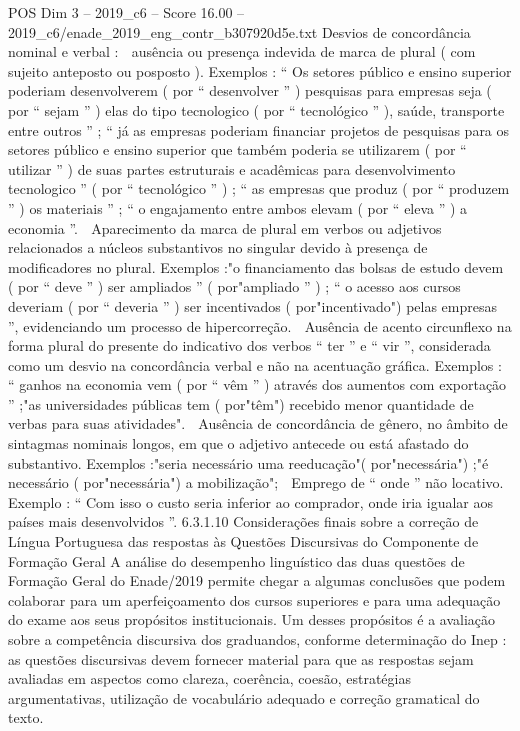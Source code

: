 \begin{textsample}{POS Dim 3 – 2019\_c6 – Score 16.00 – 2019\_c6/enade\_2019\_eng\_contr\_b307920d5e.txt}
Desvios de concordância nominal e verbal :  ausência ou presença indevida de marca de plural ( com sujeito anteposto ou posposto ).
Exemplos : “ Os setores público e ensino superior poderiam desenvolverem ( por “ desenvolver ” ) pesquisas para empresas seja ( por “ sejam ” ) elas do tipo tecnologico ( por “ tecnológico ” ), saúde, transporte entre outros ” ; “ já as empresas poderiam financiar projetos de pesquisas para os setores público e ensino superior que também poderia se utilizarem ( por “ utilizar ” ) de suas partes estruturais e acadêmicas para desenvolvimento tecnologico ” ( por “ tecnológico ” ) ; “ as empresas que produz ( por “ produzem ” ) os materiais ” ; “ o engajamento entre ambos elevam ( por “ eleva ” ) a economia ”.  Aparecimento da marca de plural em verbos ou adjetivos relacionados a núcleos substantivos no singular devido à presença de modificadores no plural.
Exemplos :"o financiamento das bolsas de estudo devem ( por “ deve ” ) ser ampliados ” ( por"ampliado ” ) ; “ o acesso aos cursos deveriam ( por “ deveria ” ) ser incentivados ( por"incentivado") pelas empresas ”, evidenciando um processo de hipercorreção.  Ausência de acento circunflexo na forma plural do presente do indicativo dos verbos “ ter ” e “ vir ”, considerada como um desvio na concordância verbal e não na acentuação gráfica.
Exemplos : “ ganhos na economia vem ( por “ vêm ” ) através dos aumentos com exportação ” ;"as universidades públicas tem ( por"têm") recebido menor quantidade de verbas para suas atividades".  Ausência de concordância de gênero, no âmbito de sintagmas nominais longos, em que o adjetivo antecede ou está afastado do substantivo.
Exemplos :"seria necessário uma reeducação"( por"necessária") ;"é necessário ( por"necessária") a mobilização";  Emprego de “ onde ” não locativo.
Exemplo : “ Com isso o custo seria inferior ao comprador, onde iria igualar aos países mais desenvolvidos ”. 6.3.1.10 Considerações finais sobre a correção de Língua Portuguesa das respostas às Questões Discursivas do Componente de Formação Geral A análise do desempenho linguístico das duas questões de Formação Geral do Enade/2019 permite chegar a algumas conclusões que podem colaborar para um aperfeiçoamento dos cursos superiores e para uma adequação do exame aos seus propósitos institucionais.
Um desses propósitos é a avaliação sobre a competência discursiva dos graduandos, conforme determinação do Inep : as questões discursivas devem fornecer material para que as respostas sejam avaliadas em aspectos como clareza, coerência, coesão, estratégias argumentativas, utilização de vocabulário adequado e correção gramatical do texto.

\end{textsample}
